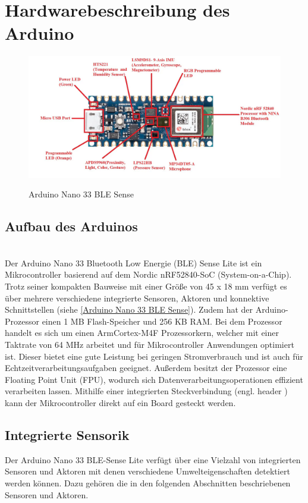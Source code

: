 
\chapter{Hardwarebeschreibung des Arduino}
\begin{figure}[htb]
	\begin{center}
		\includegraphics[width=\textwidth]{General/ArduinoBoard.png}
		\caption{Arduino Nano 33 BLE Sense}\cite{eTech.2021} \label{Arduino Nano 33 BLE Sense}
	\end{center}
\end{figure}
\section{Aufbau des Arduinos}
\cite{Ard.2024}
\\
Der Arduino Nano 33 Bluetooth Low Energie (BLE) Sense Lite ist ein Mikrocontroller basierend auf dem Nordic nRF52840-SoC (System-on-a-Chip). Trotz seiner kompakten Bauweise mit einer Größe von 45 x 18 mm verfügt es über mehrere verschiedene integrierte Sensoren, Aktoren und konnektive Schnittstellen (siehe \autoref{Arduino Nano 33 BLE Sense}). Zudem hat der Arduino-Prozessor einen 1 MB Flash-Speicher und 256 KB RAM. Bei dem Prozessor handelt es sich um einen Arm\textregistered Cortex-M4F Prozessorkern, welcher mit einer Taktrate von 64 MHz arbeitet und für Mikrocontroller Anwendungen optimiert ist. Dieser bietet eine gute Leistung bei geringen Stromverbrauch und ist auch für Echtzeitverarbeitungsaufgaben geeignet. Außerdem besitzt der Prozessor eine Floating Point Unit (FPU), wodurch sich Datenverarbeitungsoperationen effizient verarbeiten lassen.\cite{Arm}
Mithilfe einer integrierten Steckverbindung (engl. \glqq header \grqq) kann der Mikrocontroller direkt auf ein Board gesteckt werden. 

\section{Integrierte Sensorik}
Der Arduino Nano 33 BLE-Sense Lite verfügt über eine Vielzahl von integrierten Sensoren und Aktoren mit denen verschiedene Umwelteigenschaften detektiert werden können. Dazu gehören die in den folgenden Abschnitten beschriebenen Sensoren und Aktoren.
